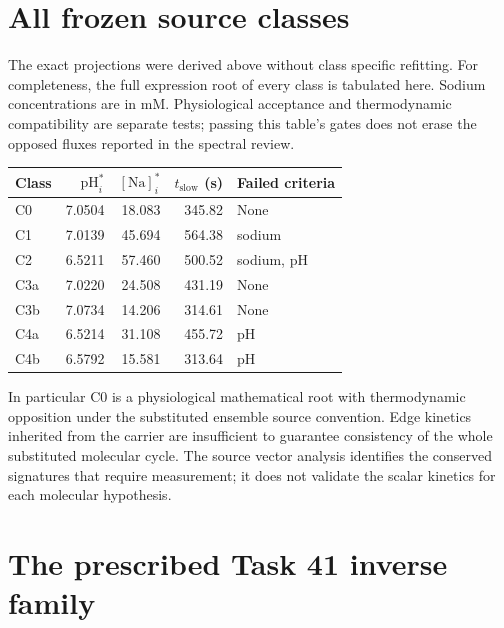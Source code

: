 \section{All frozen source classes}
The exact projections were derived above without class specific refitting.
For completeness, the full expression root of every class is tabulated here.
Sodium concentrations are in mM. Physiological acceptance and thermodynamic
compatibility are separate tests; passing this table's gates does not erase
the opposed fluxes reported in the spectral review.
\begin{center}\small

\begin{tabular}{lrrrl}
\toprule
Class & $\mathrm{pH}_i^*$ & $[\mathrm{Na}]_i^*$ & $t_{\mathrm{slow}}$ (s) & Failed criteria \\
\midrule
C0 & 7.0504 & 18.083 & 345.82 & None \\
C1 & 7.0139 & 45.694 & 564.38 & sodium \\
C2 & 6.5211 & 57.460 & 500.52 & sodium, pH \\
C3a & 7.0220 & 24.508 & 431.19 & None \\
C3b & 7.0734 & 14.206 & 314.61 & None \\
C4a & 6.5214 & 31.108 & 455.72 & pH \\
C4b & 6.5792 & 15.581 & 313.64 & pH \\
\bottomrule
\end{tabular}


\end{center}
In particular C0 is a physiological mathematical root with thermodynamic
opposition under the substituted ensemble source convention. Edge kinetics
inherited from the carrier are insufficient to guarantee consistency of
the whole substituted molecular cycle. The source vector analysis identifies
the conserved signatures that require measurement; it does not validate
the scalar kinetics for each molecular hypothesis.


\section{The prescribed Task 41 inverse family}
\label{m44sec:task41inverse}

